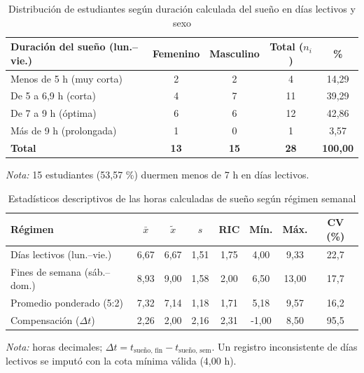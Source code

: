 \begin{table}[H]
\centering
\caption{Distribución de estudiantes según duración calculada del sueño en días lectivos y sexo}
\label{tab:c3}
\small
\begin{tabular}{lcccc}
\toprule
\textbf{Duración del sueño (lun.--vie.)} & \textbf{Femenino} & \textbf{Masculino} & \textbf{Total ($n_i$)} & \textbf{\%} \\
\midrule
Menos de 5 h (muy corta) & 2 & 2 & 4 & 14,29 \\
De 5 a 6,9 h (corta) & 4 & 7 & 11 & 39,29 \\
De 7 a 9 h (óptima) & 6 & 6 & 12 & 42,86 \\
Más de 9 h (prolongada) & 1 & 0 & 1 & 3,57 \\
\midrule
\textbf{Total} & \textbf{13} & \textbf{15} & \textbf{28} & \textbf{100,00} \\
\bottomrule
\end{tabular}
\par\smallskip\parbox{0.92\linewidth}{\footnotesize\textit{Nota:} 15 estudiantes (53,57 \%) duermen menos de 7 h en días lectivos.}
\fuente
\end{table}

\begin{table}[H]
\centering
\caption{Estadísticos descriptivos de las horas calculadas de sueño según régimen semanal}
\label{tab:c4}
\footnotesize
\begin{tabular}{lccccccc}
\toprule
\textbf{Régimen} & \textbf{$\bar{x}$} & \textbf{$\tilde{x}$} & \textbf{$s$} & \textbf{RIC} & \textbf{Mín.} & \textbf{Máx.} & \textbf{CV (\%)} \\
\midrule
Días lectivos (lun.--vie.) & 6,67 & 6,67 & 1,51 & 1,75 & 4,00 & 9,33 & 22,7 \\
Fines de semana (sáb.--dom.) & 8,93 & 9,00 & 1,58 & 2,00 & 6,50 & 13,00 & 17,7 \\
Promedio ponderado (5:2) & 7,32 & 7,14 & 1,18 & 1,71 & 5,18 & 9,57 & 16,2 \\
Compensación ($\Delta t$) & 2,26 & 2,00 & 2,16 & 2,31 & -1,00 & 8,50 & 95,5 \\
\bottomrule
\end{tabular}
\par\smallskip\parbox{0.92\linewidth}{\footnotesize\textit{Nota:} horas decimales; $\Delta t = t_{\text{sueño, fin}} - t_{\text{sueño, sem}}$. Un registro inconsistente de días lectivos se imputó con la cota mínima válida (4,00 h).}
\fuente
\end{table}

